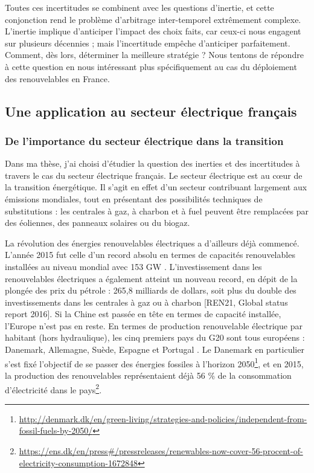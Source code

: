Toutes ces incertitudes se combinent avec les questions d’inertie, et cette conjonction rend le problème d’arbitrage inter-temporel extrêmement complexe. L’inertie implique d’anticiper l’impact des choix faits, car ceux-ci nous engagent sur plusieurs décennies ; mais l’incertitude empêche d’anticiper parfaitement. Comment, dès lors, déterminer la meilleure stratégie ? Nous tentons de répondre à cette question en nous intéressant plus spécifiquement au cas du déploiement des renouvelables en France.

\subsection{Une application au secteur électrique français}
\subsubsection{De l’importance du secteur électrique dans la transition}
Dans ma thèse, j’ai choisi d’étudier la question des inerties et des incertitudes à travers le cas du secteur électrique français. Le secteur électrique est au cœur de la transition énergétique. Il s’agit en effet d’un secteur contribuant largement aux émissions mondiales, tout en présentant des possibilités techniques de substitutions : les centrales à gaz, à charbon et à fuel peuvent être remplacées par des éoliennes, des panneaux solaires ou du biogaz.

La révolution des énergies renouvelables électriques a d’ailleurs déjà commencé. L’année 2015 fut celle d’un record absolu en termes de capacités renouvelables installées au niveau mondial avec 153 GW \citep{InternationalEnergyAgency2016}. L’investissement dans les renouvelables électriques a également atteint un nouveau record, en dépit de la plongée des prix du pétrole : 265,8 milliards de dollars, soit plus du double des investissements dans les centrales à gaz ou à charbon [REN21, Global status report 2016]. 
Si la Chine est passée en tête en termes de capacité installée, l’Europe n’est pas en reste. En termes de production renouvelable électrique par habitant (hors hydraulique), les cinq premiers pays du G20 sont tous européens : Danemark, Allemagne, Suède, Espagne et Portugal \citep[p. 21]{REN212016}. Le Danemark en particulier s’est fixé l’objectif de se passer des énergies fossiles à l’horizon 2050\footnote{\url{http://denmark.dk/en/green-living/strategies-and-policies/independent-from-fossil-fuels-by-2050/}}, et en 2015, la production des renouvelables représentaient déjà 56 \% de la consommation d'électricité dans le pays\footnote{\url{https://ens.dk/en/press\#/pressreleases/renewables-now-cover-56-procent-of-electricity-consumption-1672848}}. 

